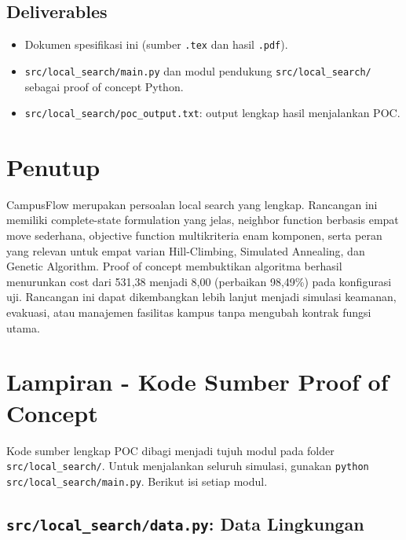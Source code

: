 \documentclass[11pt,a4paper]{article}
\begin{document}
\subsection{Deliverables}

\begin{itemize}[leftmargin=2em,itemsep=0.1em]
  \item Dokumen spesifikasi ini (sumber \texttt{.tex} dan hasil \texttt{.pdf}).
  \item \texttt{src/local\_search/main.py} dan modul pendukung \texttt{src/local\_search/} sebagai proof of concept Python.
  \item \texttt{src/local\_search/poc\_output.txt}: output lengkap hasil menjalankan POC.
\end{itemize}

\section{Penutup}

CampusFlow merupakan persoalan local search yang lengkap. Rancangan ini memiliki complete-state formulation yang jelas, neighbor function berbasis empat move sederhana, objective function multikriteria enam komponen, serta peran yang relevan untuk empat varian Hill-Climbing, Simulated Annealing, dan Genetic Algorithm. Proof of concept membuktikan algoritma berhasil menurunkan cost dari 531{,}38 menjadi 8{,}00 (perbaikan 98{,}49\%) pada konfigurasi uji. Rancangan ini dapat dikembangkan lebih lanjut menjadi simulasi keamanan, evakuasi, atau manajemen fasilitas kampus tanpa mengubah kontrak fungsi utama.

\newpage

\appendix
\section{Lampiran - Kode Sumber Proof of Concept}

Kode sumber lengkap POC dibagi menjadi tujuh modul pada folder \texttt{src/local\_search/}. Untuk menjalankan seluruh simulasi, gunakan \texttt{python src/local\_search/main.py}. Berikut isi setiap modul.

\subsection{\texttt{src/local\_search/data.py}: Data Lingkungan}
\end{document}
